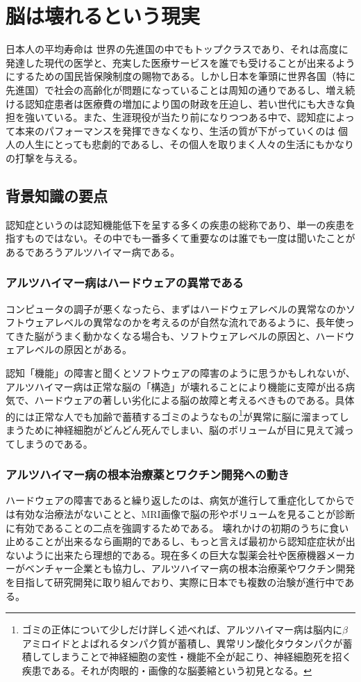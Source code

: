 \section{脳は壊れるという現実}
日本人の平均寿命は
世界の先進国の中でもトップクラスであり、それは高度に発達した現代の医学と、充実した医療サービスを誰でも受けることが出来るようにするための国民皆保険制度の賜物である。しかし日本を筆頭に世界各国（特に先進国）で社会の高齢化が問題になっていることは周知の通りであるし、増え続ける認知症患者は医療費の増加により国の財政を圧迫し、若い世代にも大きな負担を強いている。また、生涯現役が当たり前になりつつある中で、認知症によって本来のパフォーマンスを発揮できなくなり、生活の質が下がっていくのは
個人の人生にとっても悲劇的であるし、その個人を取りまく人々の生活にもかなりの打撃を与える。

\subsection{背景知識の要点}
認知症というのは認知機能低下を呈する多くの疾患の総称であり、単一の疾患を指すものではない。その中でも一番多くて重要なのは誰でも一度は聞いたことがあるであろうアルツハイマー病である。

\subsubsection{アルツハイマー病はハードウェアの異常である}
コンピュータの調子が悪くなったら、まずはハードウェアレベルの異常なのかソフトウェアレベルの異常なのかを考えるのが自然な流れであるように、長年使ってきた脳がうまく動かなくなる場合も、ソフトウェアレベルの原因と、ハードウェアレベルの原因とがある。

認知「機能」の障害と聞くとソフトウェアの障害のように思うかもしれないが、アルツハイマー病は正常な脳の「構造」が壊れることにより機能に支障が出る病気で、ハードウェアの著しい劣化による脳の故障と考えるべきものである。具体的には正常な人でも加齢で蓄積するゴミのようなもの\footnote{ゴミの正体について少しだけ詳しく述べれば、アルツハイマー病は脳内に$\beta$アミロイドとよばれるタンパク質が蓄積し、異常リン酸化タウタンパクが蓄積してしまうことで神経細胞の変性・機能不全が起こり、神経細胞死を招く疾患である。それが肉眼的・画像的な脳萎縮という初見となる。}が異常に脳に溜まってしまうために神経細胞がどんどん死んでしまい、脳のボリュームが目に見えて減ってしまうのである。

\subsubsection{アルツハイマー病の根本治療薬とワクチン開発への動き}
ハードウェアの障害であると繰り返したのは、病気が進行して重症化してからでは有効な治療法がないことと、MRI画像で脳の形やボリュームを見ることが診断に有効であることの二点を強調するためである。
壊れかけの初期のうちに食い止めることが出来るなら画期的であるし、もっと言えば最初から認知症症状が出ないように出来たら理想的である。現在多くの巨大な製薬会社や医療機器メーカーがベンチャー企業とも協力し、アルツハイマー病の根本治療薬やワクチン開発を目指して研究開発に取り組んでおり、実際に日本でも複数の治験が進行中である。

